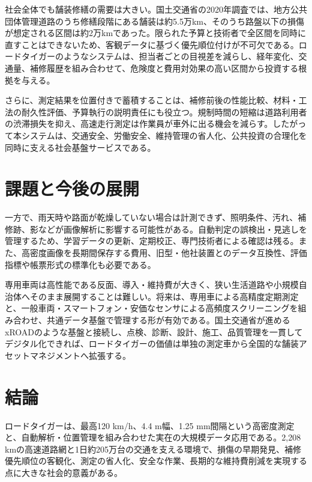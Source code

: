 \documentclass[8pt,a4paper,twocolumn]{ltjsarticle}
\begin{document}
社会全体でも舗装修繕の需要は大きい。国土交通省の2020年調査では、地方公共団体管理道路のうち修繕段階にある舗装は約5.5万km、そのうち路盤以下の損傷が想定される区間は約2万kmであった\cite{mlit2020}。限られた予算と技術者で全区間を同時に直すことはできないため、客観データに基づく優先順位付けが不可欠である。ロードタイガーのようなシステムは、担当者ごとの目視差を減らし、経年変化、交通量、補修履歴を組み合わせて、危険度と費用対効果の高い区間から投資する根拠を与える。

さらに、測定結果を位置付きで蓄積することは、補修前後の性能比較、材料・工法の耐久性評価、予算執行の説明責任にも役立つ。規制時間の短縮は道路利用者の渋滞損失を抑え、高速走行測定は作業員が車外に出る機会を減らす。したがって本システムは、交通安全、労働安全、維持管理の省人化、公共投資の合理化を同時に支える社会基盤サービスである。

\section{課題と今後の展開}

一方で、雨天時や路面が乾燥していない場合は計測できず、照明条件、汚れ、補修跡、影などが画像解析に影響する可能性がある\cite{catalog2025}。自動判定の誤検出・見逃しを管理するため、学習データの更新、定期校正、専門技術者による確認は残る。また、高密度画像を長期間保存する費用、旧型・他社装置とのデータ互換性、評価指標や帳票形式の標準化も必要である。

専用車両は高性能である反面、導入・維持費が大きく、狭い生活道路や小規模自治体へそのまま展開することは難しい。将来は、専用車による高精度定期測定と、一般車両・スマートフォン・安価なセンサによる高頻度スクリーニングを組み合わせ、共通データ基盤で管理する形が有効である。国土交通省が進めるxROADのような基盤と接続し、点検、診断、設計、施工、品質管理を一貫してデジタル化できれば、ロードタイガーの価値は単独の測定車から全国的な舗装アセットマネジメントへ拡張する\cite{xroad2022}。

\section{結論}

ロードタイガーは、最高120 km/h、4.4 m幅、1.25 mm間隔という高密度測定と、自動解析・位置管理を組み合わせた実在の大規模データ応用である。2,208 kmの高速道路網と1日約205万台の交通を支える環境で、損傷の早期発見、補修優先順位の客観化、測定の省人化、安全な作業、長期的な維持費削減を実現する点に大きな社会的意義がある。
\end{document}
